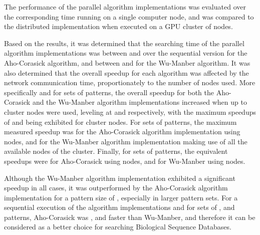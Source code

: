 \documentclass{ws-ijait}
\begin{document}
The performance of the parallel algorithm implementations was evaluated over the corresponding time running on a single computer node, and was compared to the distributed implementation when executed on a GPU cluster of  nodes. 

Based on the results, it was determined that the searching time of the parallel algorithm implementations was between  and  over the sequential version for the Aho-Corasick algorithm, and between  and  for the Wu-Manber algorithm. It was also determined that the overall speedup for each algorithm was affected by the network communication time, proportionately to the number of nodes used. More specifically and for sets of  patterns, the overall speedup for both the Aho-Corasick and the Wu-Manber algorithm implementations increased when up to  cluster nodes were used, leveling at  and  respectively, with the maximum speedups of  and  being exhibited for  cluster nodes. For sets of  patterns, the maximum measured speedup was  for the Aho-Corasick algorithm implementation using  nodes, and  for the Wu-Manber algorithm implementation making use of all the available nodes of the cluster. Finally, for sets of  patterns, the equivalent speedups were  for Aho-Corasick using  nodes, and  for Wu-Manber using  nodes.

Although the Wu-Manber algorithm implementation exhibited a significant speedup in all cases, it was outperformed by the Aho-Corasick algorithm implementation for a pattern size of , especially in larger pattern sets. For a sequential execution of the algorithm implementations and for sets of ,  and  patterns, Aho-Corasick was ,  and  faster than Wu-Manber, and therefore it can be considered as a better choice for searching Biological Sequence Databases.



\end{document}
